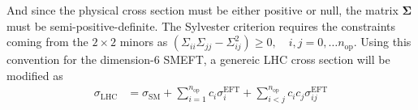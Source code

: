 And since the physical cross section must be either positive or null, the matrix $\boldsymbol{\Sigma}$ must be semi-positive-definite. The Sylvester criterion requires the constraints coming from the $2\times 2$ minors as $\left(\Sigma_{i i} \Sigma_{j j}-\Sigma_{i j}^{2}\right) \geq 0, \quad i, j=0, \ldots n_{\mathrm{op}}$. Using this convention for the dimension-6 SMEFT, a genereic LHC cross section will be modified as
\begin{equation}
    \begin{aligned}
    \sigma_{\text{LHC}} &=\sigma_{\mathrm{SM}}+\sum_{i=1}^{n_{\mathrm{op}}} c_{i} \sigma_{i}^{\text{EFT}}+\sum_{i<j}^{n_{\mathrm{op}}} c_{i} c_{j} \sigma_{i j}^{\text{EFT}}
    \end{aligned}
\end{equation}


